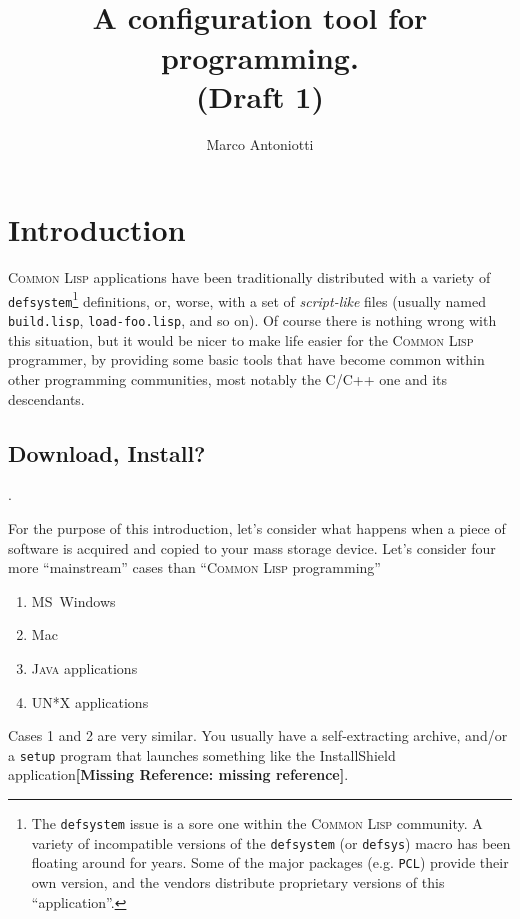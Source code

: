 \documentclass[a4paper]{article}
\title{
\DEFCONFIGURATION{}\\
{\normalsize A configuration tool for \CL{} programming.}\\
(Draft 1)
}
\author{Marco Antoniotti}
\newcommand{\CL}{\textsc{Common Lisp}}
\newcommand{\Java}{\textsc{Java}}
\newcommand{\checkref}[1]{{\textbf{[Missing Reference: #1]}}}
\newcommand{\code}[1]{\texttt{#1}}
\begin{document}


\maketitle

\section{Introduction}

\CL{} applications have been traditionally distributed with a variety
of \texttt{defsystem}\footnote{The \texttt{defsystem} issue is a sore
one within the \CL{} community.  A variety of incompatible versions of
the \code{defsystem} (or \texttt{defsys}) macro has been floating
around for years. Some of the major packages (e.g. \texttt{PCL})
provide their own version, and the vendors distribute proprietary
versions of this ``application''.} definitions, or, worse, with a set
of \emph{script-like} files (usually named \texttt{build.lisp},
\texttt{load-foo.lisp}, and so on).  Of course there is nothing wrong
with this situation, but it would be nicer to make life easier for the
\CL{} programmer, by providing some basic tools that have become
common within other programming communities, most notably the C/C++
one and its descendants.

\subsection{Download, Install?}.

For the purpose of this introduction, let's consider what happens when
a piece of software is acquired and copied to your mass storage
device. Let's consider four more ``mainstream'' cases than ``\CL{}
programming''
\begin{enumerate}
\item	MS~Windows
\item	Mac
\item	\Java{} applications
\item	UN*X applications
\end{enumerate}

Cases 1 and 2 are very similar.  You usually have a self-extracting
archive, and/or a \texttt{setup} program that launches something like
the \textsf{InstallShield} application\checkref{missing reference}.
\end{document}
